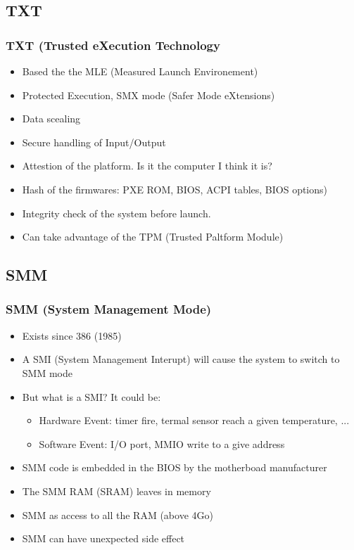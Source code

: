 \subsection{TXT}
        \begin{frame}
        \frametitle{TXT (Trusted eXecution Technology}
        \begin{itemize}
                \item Based the the MLE (Measured Launch Environement)
                \item Protected Execution, SMX mode (Safer Mode
                eXtensions)
                \item Data scealing %
                \item Secure handling of Input/Output
                \item Attestion of the platform. Is it the computer I
                think it is?
                \item Hash of the firmwares: PXE ROM, BIOS, ACPI tables, BIOS options)
                \item Integrity check of the system before launch.
                \item Can take advantage of the TPM (Trusted Paltform
                Module)
        \end{itemize}
        \end{frame}

\subsection{SMM}
        \begin{frame}
        \frametitle{SMM (System Management Mode)}
        \begin{itemize}
                \item Exists since 386 (1985)
                \item A SMI (System Management Interupt) will cause the
                system to switch to SMM mode
                \item But what is a SMI? It could be:
                        \begin{itemize}
                        \item Hardware Event: timer fire, termal sensor
                        reach a given temperature, ...
                        \item Software Event: I/O port, MMIO write to a
                        give address
                        \end{itemize}
                \item SMM code is embedded in the BIOS by the motherboad manufacturer
                \item The SMM RAM (SRAM) leaves in memory
                \item SMM as access to all the RAM (above 4Go)
                \item SMM can have unexpected side effect
        \end{itemize}
        \end{frame}

